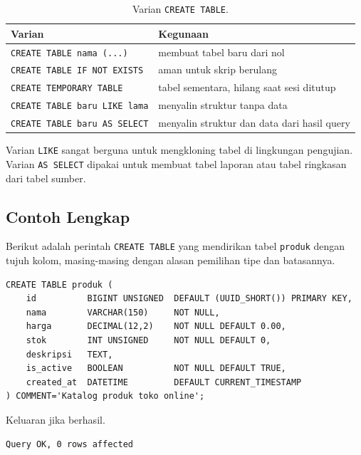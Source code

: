 \documentclass[11pt,a4paper]{article}
\begin{document}
\begin{table}[H]
	\centering
	\caption{Varian \texttt{CREATE TABLE}.}
	\label{tab:create-variants}
	\small
	\begin{tabularx}{\textwidth}{l X}
		\toprule
		Varian                               & Kegunaan                                    \\
		\midrule
		\texttt{CREATE TABLE nama (...)}     & membuat tabel baru dari nol                 \\
		\texttt{CREATE TABLE IF NOT EXISTS}  & aman untuk skrip berulang                   \\
		\texttt{CREATE TEMPORARY TABLE}      & tabel sementara, hilang saat sesi ditutup   \\
		\texttt{CREATE TABLE baru LIKE lama} & menyalin struktur tanpa data                \\
		\texttt{CREATE TABLE baru AS SELECT} & menyalin struktur dan data dari hasil query \\
		\bottomrule
	\end{tabularx}
\end{table}

Varian \texttt{LIKE} sangat berguna untuk mengkloning tabel di lingkungan pengujian. Varian \texttt{AS SELECT} dipakai untuk membuat tabel laporan atau tabel ringkasan dari tabel sumber.

\subsection{Contoh Lengkap}

Berikut adalah perintah \texttt{CREATE TABLE} yang mendirikan tabel \texttt{produk} dengan tujuh kolom, masing-masing dengan alasan pemilihan tipe dan batasannya.

\begin{lstlisting}[style=code]
CREATE TABLE produk (
    id          BIGINT UNSIGNED  DEFAULT (UUID_SHORT()) PRIMARY KEY,
    nama        VARCHAR(150)     NOT NULL,
    harga       DECIMAL(12,2)    NOT NULL DEFAULT 0.00,
    stok        INT UNSIGNED     NOT NULL DEFAULT 0,
    deskripsi   TEXT,
    is_active   BOOLEAN          NOT NULL DEFAULT TRUE,
    created_at  DATETIME         DEFAULT CURRENT_TIMESTAMP
) COMMENT='Katalog produk toko online';
\end{lstlisting}

Keluaran jika berhasil.

\begin{lstlisting}[style=out]
Query OK, 0 rows affected
\end{lstlisting}
\end{document}
